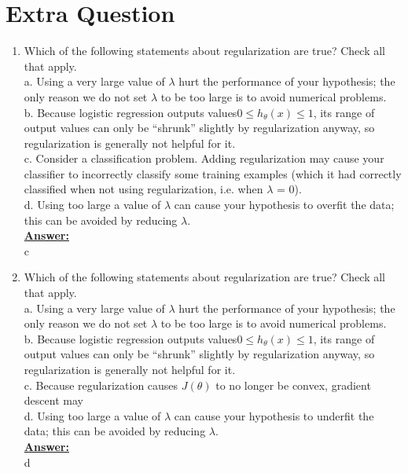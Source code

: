 \documentclass{article}
\newenvironment{qparts}{\begin{enumerate}[1.]}{\end{enumerate}}
\begin{document}
\section{Extra Question}
\begin{qparts}

 \item Which of the following statements about regularization are true? Check all that apply.\\
a. Using a very large value of $\lambda$ hurt the performance of your hypothesis; the only reason we do not set $\lambda$ to be too large is to avoid numerical problems.\\
b. Because logistic regression outputs values$ 0 \leq h_\theta(x) \leq 1$, its range of output values can only be “shrunk” slightly by regularization anyway, so regularization is generally not helpful for it.\\
c. Consider a classification problem. Adding regularization may cause your classifier to incorrectly classify some training examples (which it had correctly classified when not using regularization, i.e. when $\lambda$ = 0).\\
d. Using too large a value of $\lambda$ can cause your hypothesis to overfit the data; this can be avoided by reducing $\lambda$.\\
 \underline{\textbf{Answer:}}\\
 c

 \item Which of the following statements about regularization are true? Check all that apply.\\
a. Using a very large value of $\lambda$ hurt the performance of your hypothesis; the only reason we do not set $\lambda$ to be too large is to avoid numerical problems.\\
b. Because logistic regression outputs values$ 0 \leq h_\theta(x) \leq 1$, its range of output values can only be “shrunk” slightly by regularization anyway, so regularization is generally not helpful for it.\\
c. Because regularization causes $J(\theta)$ to no longer be convex, gradient descent may\\
d. Using too large a value of $\lambda$ can cause your hypothesis to underfit the data; this can be avoided by reducing $\lambda$.\\
 \underline{\textbf{Answer:}}\\
d


\end{qparts}
\end{document}

